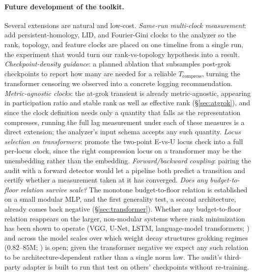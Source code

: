 \documentclass[11pt]{article}
\begin{document}
\paragraph{Future development of the toolkit.} Several extensions are natural and low-cost.
\emph{Same-run multi-clock measurement}: add persistent-homology, LID, and Fourier-Gini clocks to the
analyzer so the rank, topology, and feature clocks are placed on one timeline from a single run, the
experiment that would turn our rank-vs-topology hypothesis into a result. \emph{Checkpoint-density
guidance}: a planned ablation that subsamples post-grok checkpoints to report how many are needed for a
reliable $T_{\mathrm{compress}}$, turning the transformer censoring we observed into a concrete logging
recommendation. \emph{Metric-agnostic clocks}: the at-grok transient is already metric-agnostic, appearing in
participation ratio and stable rank as well as effective rank (\S\ref{sec:atgrok}), and since the clock
definition needs only a quantity that falls as the representation compresses, running the full lag
measurement under each of these measures is a direct extension; the analyzer's input schema accepts any
such quantity. \emph{Locus selection on transformers}: promote the
two-point E-vs-U locus check into a full per-locus clock, since the right compression locus on a
transformer may be the unembedding rather than the embedding. \emph{Forward/backward coupling}: pairing
the audit with a forward detector \citep{wang2026spectral,xu2026earlywarning} would let a pipeline both
predict a transition and certify whether a measurement taken at it has converged. \emph{Does any
budget-to-floor relation survive scale?} The monotone budget-to-floor relation is established on a small
modular MLP, and the first
generality test, a second architecture, already comes back negative (\S\ref{sec:transformer}).
Whether any budget-to-floor relation reappears on the larger, non-modular systems where rank minimization
has been shown to operate (VGG, U-Net, LSTM, language-model transformers; \citealp{yunis2024spectral})
and across the model scales over which weight decay structures grokking regimes ($0.82$--$85$M;
\citealp{verma2026weightdecay}) is open; given the transformer negative we expect any such relation to be
architecture-dependent rather than a single norm law. The audit's third-party adapter is built to run
that test on others' checkpoints without re-training.
\end{document}
